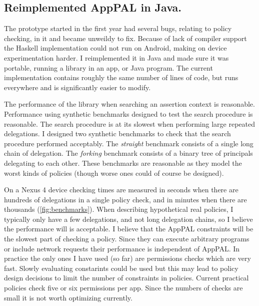 \documentclass[a4paper]{scrartcl}
\begin{document}
\subsection{Reimplemented AppPAL in Java.}

The prototype started in the first year had several bugs, relating to policy checking, in it and became unweildy to fix.
Because of lack of compiler support the Haskell implementation could not run on Android, making on device experimentation harder.
I reimplemented it in Java and made sure it was portable, running a library in an app, or Java program.
The current implementation contains roughly the same number of lines of code, but runs everywhere and is significantly easier to modify.

The performance of the library when searching an assertion context is reasonable.
Performance using synthetic benchmarks designed to test the search procedure is reasonable.
The search procedure is at its slowest when performing large repeated delegations.
I designed two synthetic benchmarks to check that the search procedure performed acceptably.
The \emph{straight} benchmark consists of a single long chain of delegation.
The \emph{forking} benchmark consists of a binary tree of principals delegating to each other.
These benchmarks are reasonable as they model the worst kinds of policies (though worse ones could of course be designed).

On a Nexus 4 device checking times are measured in seconds when there are hundreds of delegations in a single policy check, and in minutes when there are thousands (\autoref{fig:benchmarks}).
When describing hypothetical real policies, I typically only have a few delegations, and not long delegation chains, so I believe the performance will is acceptable.
I believe that the AppPAL constraints will be the slowest part of checking a policy.
Since they can execute arbitrary programs or include network requests their performance is independent of AppPAL.
In practice the only ones I have used (so far) are permissions checks which are very fast.
Slowly evaluating constarints could be used but this may lead to policy design decisions to limit the number of constraints in policies.
Current practical policies check five or six permissions per app.
Since the numbers of checks are small it is not worth optimizing currently.
\end{document}

